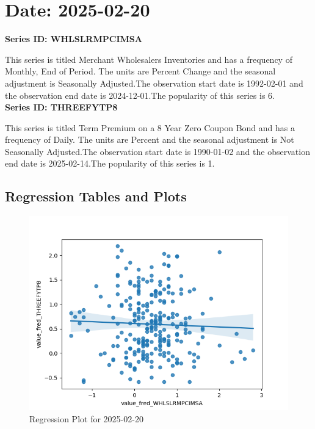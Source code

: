 \section{Date: 2025-02-20}
\noindent \textbf{Series ID: WHLSLRMPCIMSA} 

\noindent This series is titled Merchant Wholesalers Inventories and has a frequency of Monthly, End of Period. The units are Percent Change and the seasonal adjustment is Seasonally Adjusted.The observation start date is 1992-02-01 and the observation end date is 2024-12-01.The popularity of this series is 6. \\ 

\noindent \textbf{Series ID: THREEFYTP8} 

\noindent This series is titled Term Premium on a 8 Year Zero Coupon Bond and has a frequency of Daily. The units are Percent and the seasonal adjustment is Not Seasonally Adjusted.The observation start date is 1990-01-02 and the observation end date is 2025-02-14.The popularity of this series is 1. \\ 

\subsection{Regression Tables and Plots}


\begin{figure}
\centering
\includegraphics[scale = 0.9]{plots/plot_2025-02-20.png}
\caption{Regression Plot for 2025-02-20}
\end{figure}
\newpage
